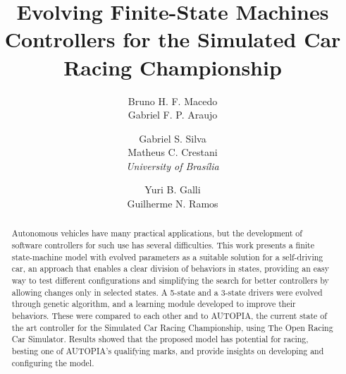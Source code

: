 \documentclass[a4paper]{sbgames}
\title{Evolving Finite-State Machines Controllers for the Simulated Car Racing Championship}
\author{Bruno H. F. Macedo\\Gabriel F. P. Araujo\and Gabriel S. Silva\\Matheus C. Crestani\\\textit{University of Bras\'{i}lia}\and Yuri B. Galli\\Guilherme N. Ramos}
\begin{document}
	\maketitle

	\begin{abstract}
		Autonomous vehicles have many practical applications, but the development of software controllers for such use has several difficulties. This work presents a finite state-machine model with evolved parameters as a suitable solution for a self-driving car, an approach that enables a clear division of behaviors in states, providing an easy way to test different configurations and simplifying the search for better controllers by allowing changes only in selected states. A 5-state and a 3-state drivers were evolved through genetic algorithm, and a learning module developed to improve their behaviors. These were compared to each other and to AUTOPIA, the current state of the art controller for the Simulated Car Racing Championship, using The Open Racing Car Simulator. Results showed that the proposed model has potential for racing, besting one of AUTOPIA's qualifying marks, and provide insights on developing and configuring the model.
	\end{abstract}

	\keywordlist
	\contactlist

	\FloatBarrier%


	
	
\end{document}
